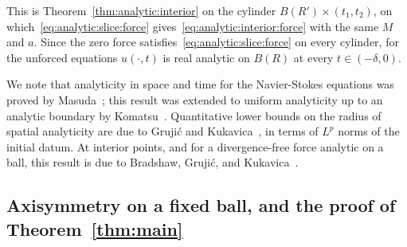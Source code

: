 \documentclass[11pt,reqno]{amsproc}
\numberwithin{equation}{section}
\theoremstyle{remark}
\begin{document}
This is Theorem~\ref{thm:analytic:interior} on the cylinder $B(R')\times(t_1,t_2)$, on which~\eqref{eq:analytic:slice:force} gives~\eqref{eq:analytic:interior:force} with the same $M$ and $a$. Since the zero force satisfies~\eqref{eq:analytic:slice:force} on every cylinder, for the unforced equations $u(\cdot,t)$ is real analytic on $B(R)$ at every $t\in(-\delta,0)$.

We note that analyticity in space and time for the Navier-Stokes equations was proved by Masuda~\cite{Masuda67}; this result was extended to uniform analyticity up to an analytic boundary by Komatsu~\cite{Komatsu80}. Quantitative lower bounds on the radius of spatial analyticity are due to Gruji\'c and Kukavica~\cite{GK98}, in terms of $L^p$ norms of the initial datum. At interior points, and for a divergence-free force analytic on a ball, this result is due to Bradshaw, Gruji\'c, and Kukavica~\cite{BGK15}.

\subsection{Axisymmetry on a fixed ball, and the proof of Theorem~\texorpdfstring{\ref{thm:main}}{1.1}}
\label{sec:reduction:core}
\end{document}
